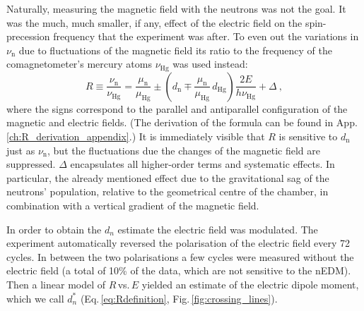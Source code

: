Naturally, measuring the magnetic field with the neutrons was not the goal.
It was the much, much smaller, if any, effect of the electric field on the spin-precession frequency that the experiment was after.
To even out the variations in $\nu_\text{n}$ due to fluctuations of the magnetic field its ratio to the frequency of the comagnetometer's mercury atoms $\nu_\text{Hg}$ was used instead:
\begin{equation}
  \label{eq:Rdefinition}
  R \equiv \frac{\nu_\text{n}}{\nu_\text{Hg}} = \frac{\mu_\text{n}}{\mu_\text{Hg}} \pm \left( d_\text{n} \mp \frac{\mu_\text{n}}{\mu_\text{Hg}} \, d_\text{Hg} \right) \frac{2 E}{ h  \nu_\text{Hg}} + \Delta \ ,
\end{equation}
where the signs correspond to the parallel and antiparallel configuration of the magnetic and electric fields.
(The derivation of the formula can be found in App.\,\ref{ch:R_derivation_appendix}.)
It is immediately visible that $R$ is sensitive to $d_\text{n}$ just as $\nu_\text{n}$, but the fluctuations due the changes of the magnetic field are suppressed.
$\Delta$ encapsulates all higher-order terms and systematic effects.
In particular, the already mentioned effect due to the gravitational sag of the neutrons' population, relative to the geometrical centre of the chamber, in combination with a vertical gradient of the magnetic field.

In order to obtain the $d_n$ estimate the electric field was modulated.
The experiment automatically reversed the polarisation of the electric field every 72 cycles.
In between the two polarisations a few cycles were measured without the electric field (a total of 10\% of the data, which are not sensitive to the nEDM).
Then a linear model of  $R$\,vs.\,$E$ yielded an estimate of the electric dipole moment, which we call $d_n^*$ (Eq.\,\ref{eq:Rdefinition}, Fig.\,\ref{fig:crossing_lines}).


